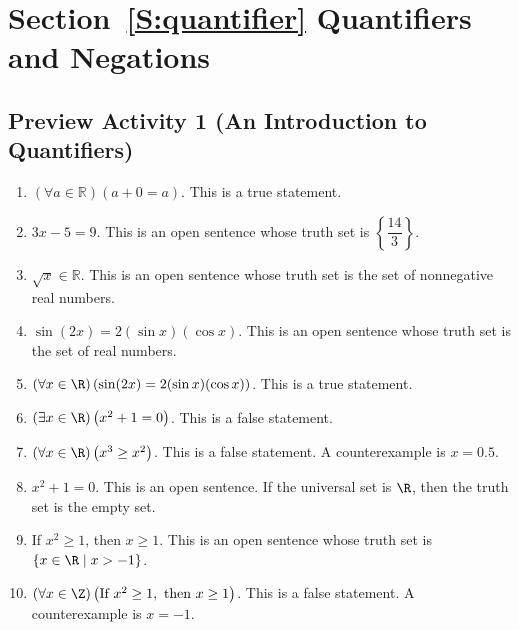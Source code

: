 \section*{Section~\ref{S:quantifier} Quantifiers and Negations}
\subsection*{Preview Activity 1 (An Introduction to Quantifiers)}
\begin{enumerate}
    \item $\left( \forall a \in \mathbb{R}\right) \left(a + 0 = a\right)$.  This is a true statement.
    \item $3x - 5 = 9$.  This is an open sentence whose truth set is $\left\{ \dfrac{14}{3} \right\}$.
    \item $\sqrt x  \in \mathbb{R}$.  This is an open sentence whose truth set is the set of nonnegative real numbers.
    \item $\sin( {2x} ) = 2( {\sin x} )( {\cos x})$.  This is an open sentence whose truth set is the set of real numbers.
    \item $\left( \forall x \in \R\right) \left(\sin( {2x} ) = 2( {\sin x})( {\cos x}) \right)$.  This is a true statement.
    \item $\left( \exists x \in \R \right)\left( x^2  + 1 = 0 \right)$.  This is a false statement.
    \item $\left( \forall x \in \R \right) \left( x^3  \geq x^2 \right)$.  This is a false statement.  A counterexample is $x = 0.5$.
    \item $x^2  + 1 = 0$.  This is an open sentence.  If the universal set is $\R$, then the truth set is the empty set.
    \item If  $x^2 \geq 1$, then  $x  \geq 1$.  This is an open sentence whose truth set is 
$\left\{ x \in \R \mid x > -1 \right\}$.
    \item $\left( \forall x \in \Z \right)\left( \text{If } x^2 \geq 1, \text{ then } x \geq 1 \right)$.  This is a false statement.  A counterexample is $x = -1$.
\end{enumerate}
\hbreak



